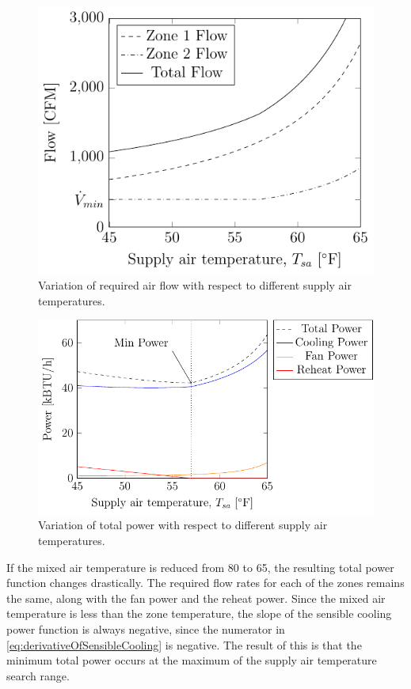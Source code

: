 \begin{figure}
\centering
\includegraphics{Plots/33-SimplifiedExampleFlow/simplifiedExampleFlow.pdf}
\caption{Variation of required air flow with respect to different supply
air temperatures.}
\label{fig:simplifiedExampleFlow}
\end{figure}

\begin{figure}
\centering
\includegraphics{Plots/32-SimplifiedExample/simplifiedExample.pdf}
\caption{Variation of total power with respect to different supply air
temperatures. }
\label{fig:simplifiedExamplePower}
\end{figure}

If the mixed air temperature is reduced from \SI{80}{\degreeF} to
\SI{65}{\degreeF}, the resulting total power function changes
drastically. The required flow rates for each of the zones remains the
same, along with the fan power and the reheat power. Since the mixed air
temperature is less than the zone temperature, the slope of the sensible
cooling power function is always negative, since the numerator in
 \ref{eq:derivativeOfSensibleCooling} is negative. The
result of this is that the minimum total power occurs at the maximum of
the supply air temperature search range.   

